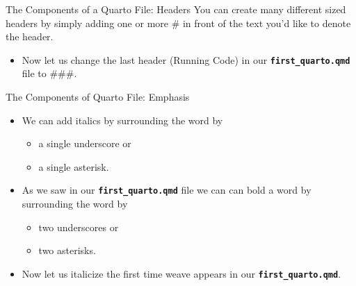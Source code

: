\documentclass[
  ignorenonframetext,
]{beamer}
\providecommand{\tightlist}{%
  \setlength{\itemsep}{0pt}\setlength{\parskip}{0pt}}
\begin{document}
\begin{frame}[fragile]{The Components of a Quarto File: Headers}
\protect\hypertarget{the-components-of-a-quarto-file-headers}{}
You can create many different sized headers by simply adding one or more
\# in front of the text you'd like to denote the header.

\begin{tcolorbox}



\end{tcolorbox}

\begin{itemize}
\tightlist
\item
  Now let us change the last header (Running Code) in our
  \textbf{\texttt{first\_quarto.qmd}} file to \#\#\#.
\end{itemize}
\end{frame}

\begin{frame}[fragile]{The Components of Quarto File: Emphasis}
\protect\hypertarget{the-components-of-quarto-file-emphasis}{}
\begin{itemize}
\item
  We can add italics by surrounding the word by

  \begin{itemize}
  \tightlist
  \item
    a single underscore or
  \item
    a single asterisk.
  \end{itemize}
\item
  As we saw in our \textbf{\texttt{first\_quarto.qmd}} file we can can
  bold a word by surrounding the word by

  \begin{itemize}
  \tightlist
  \item
    two underscores or
  \item
    two asterisks.
  \end{itemize}
\item
  Now let us italicize the first time weave appears in our
  \textbf{\texttt{first\_quarto.qmd}}.
\end{itemize}
\end{frame}
\end{document}
